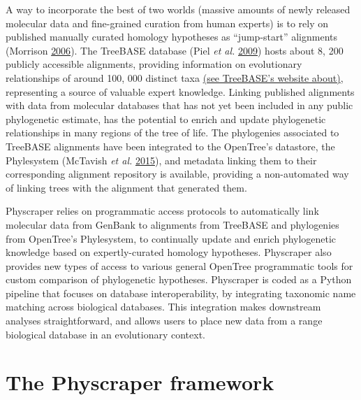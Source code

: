 \documentclass[]{article}
\begin{document}
A way to incorporate the best of two worlds (massive amounts of newly released molecular data and fine-grained curation from human experts) is to rely on published manually curated homology hypotheses as ``jump-start'' alignments (Morrison \protect\hyperlink{ref-morrison2006multiple}{2006}). The TreeBASE database (Piel \emph{et al.} \protect\hyperlink{ref-piel2009treebase}{2009}) hosts about 8, 200 publicly accessible alignments, providing information on evolutionary relationships of around 100, 000 distinct taxa \href{https://www.treebase.org/treebase-web/home.html\#:~:text=TreeBASE\%20is\%20produced\%20and\%20governed,mapped\%20to\%20104\%2C593\%20distinct\%20taxa.}{(see TreeBASE's website about)}, representing a source of valuable expert knowledge. Linking published alignments with data from molecular databases that has not yet been included in any public phylogenetic estimate, has the potential to enrich and update phylogenetic relationships in many regions of the tree of life. The phylogenies associated to TreeBASE alignments have been integrated to the OpenTree's datastore, the Phylesystem (McTavish \emph{et al.} \protect\hyperlink{ref-mctavish2015phylesystem}{2015}), and metadata linking them to their corresponding alignment repository is available, providing a non-automated way of linking trees with the alignment that generated them.

Physcraper relies on programmatic access protocols to automatically link molecular data from GenBank to alignments from TreeBASE and phylogenies from OpenTree's Phylesystem, to continually update and enrich phylogenetic knowledge based on expertly-curated homology hypotheses. Physcraper also provides new types of access to various general OpenTree programmatic tools for custom comparison of phylogenetic hypotheses.
Physcraper is coded as a Python pipeline that focuses on database interoperability, by integrating taxonomic name matching across biological databases. This integration makes downstream analyses straightforward, and allows users to place new data from a range biological database in an evolutionary context.

\hypertarget{the-physcraper-framework}{%
\section{The Physcraper framework}\label{the-physcraper-framework}}
\end{document}
